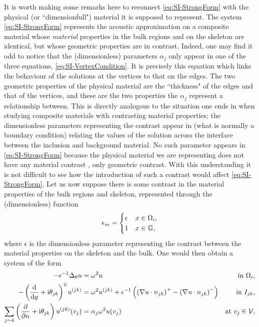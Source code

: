 It is worth making some remarks here to reconnect \eqref{eq:SI-StrongForm} with the physical (or ``dimensionfull") material it is supposed to represent.
The system \eqref{eq:SI-StrongForm} represents the acoustic approximation on a composite material whose \emph{material} properties in the bulk regions and on the skeleton are identical, but whose geometric properties are in contrast.
Indeed, one may find it odd to notice that the (dimensionless) parameters $\alpha_j$ only appear in one of the three equations, \eqref{eq:SI-VertexCondition}.
It is precisely this equation which links the behaviour of the solutions at the vertices to that on the edges. 
The two geometric properties of the physical material are the ``thickness" of the edges and that of the vertices, and these are the two properties the $\alpha_j$ represent a relationship between.
This is directly analogous to the situation one ends in when studying composite materials with contrasting material properties; the dimensionless parameters representing the contrast appear in (what is normally a boundary condition) relating the values of the solution across the interface between the inclusion and background material.
No such parameter appears in \eqref{eq:SI-StrongForm} because the physical material we are representing does not have any material contrast , only geometric contrast.
With this understanding it is not difficult to see how the introduction of such a contrast would affect \eqref{eq:SI-StrongForm}.
Let us now suppose there is some contrast in the material properties of the bulk regions and skeleton, represented through the (dimensionless) function
\begin{align*}
	\epsilon_m =
	\begin{cases} \epsilon & x\in\Omega_i, \\ 1 & x\in\mathbb{G}, \end{cases}
\end{align*}
where $\epsilon$ is the dimensionless parameter representing the contrast between the material properties on the skeleton and the bulk.
One would then obtain a system of the form 
\begin{subequations}
	\begin{align*}
		-\epsilon^{-1}\Delta_\theta u 
		&= \omega^2 u 
		&\text{in } \Omega_i, \\
		- \left( \dfrac{\mathrm{d}}{\mathrm{d}y} + \mathrm{i}\theta_{jk} \right)^2u^{(jk)}  
		&= \omega^2 u^{(jk)} + \epsilon^{-1}\left( \left( \nabla u\cdot n_{jk} \right)^+ - \left( \nabla u\cdot n_{jk} \right)^- \right)
		&\text{in } I_{jk}, \\
		\sum_{j\sim k} \left( \dfrac{\partial }{\partial n}+\mathrm{i}\theta_{jk} \right) u^{(jk)}(v_j) 
		&= \alpha_j\omega^2 u(v_j)
		&\text{at } v_j\in\mathcal{V},
	\end{align*}
\end{subequations}

